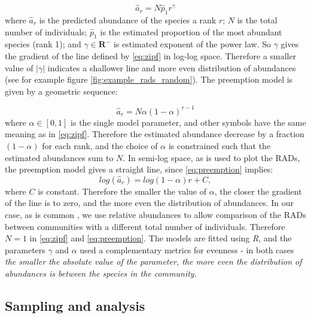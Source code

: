 \begin{equation}
\hat{a}_r = N\hat{p}_1r^{\gamma}
\label{eq:zipf}
\end{equation}
%
where $\hat{a}_r$ is the predicted abundance of the species a rank $r$; $N$ is the total number of individuals; $\hat{p}_1$ is the estimated proportion of the most abundant species (rank 1); and $\gamma \in \mathbf{R}^-$ is estimated exponent of the power law. So $\gamma$ gives the gradient of the line defined by \eqref{eq:zipf} in log-log space. Therefore a smaller value of $\left| \gamma \right|$ indicates a shallower line and more even distribution of abundances (see for example figure \ref{fig:example_rads_random}). The preemption model is given by a geometric sequence:

\begin{equation}
\hat{a}_r = N\alpha(1-\alpha)^{r-1}
\label{eq:preemption}
\end{equation}
%  
where $\alpha \in [0,1]$ is the single model parameter, and other symbols have the same meaning as in \eqref{eq:zipf}. Therefore the estimated abundance decrease by a fraction $(1-\alpha)$ for each rank, and the choice of $\alpha$ is constrained such that the estimated abundances sum to $N$. In semi-log space, as is used to plot the RADs, the preemption model gives a straight line, since \eqref{eq:preemption} implies:
\begin{equation}
log\left(\hat{a}_r\right) = log\left(1-\alpha\right)r + C,
\label{eq:preemption}
\end{equation}
%  
where $C$ is constant. Therefore the smaller the value of $\alpha$, the closer the gradient of the line is to zero, and the more even the distribution of abundances. In our case, as is common \cite{oksanen2007vegan}, we use relative abundances to allow comparison of the RADs between communities with a different total number of individuals. Therefore $N=1$ in \eqref{eq:zipf} and \eqref{eq:preemption}. The models are fitted using \emph{R}, and the parameters $\gamma$ and $\alpha$ used a complementary metrics for evenness - in both cases \emph{the smaller the absolute value of the parameter, the more even the distribution of abundances is between the species in the community}.   

\subsection{Sampling and analysis}
\label{sec:sampling}

